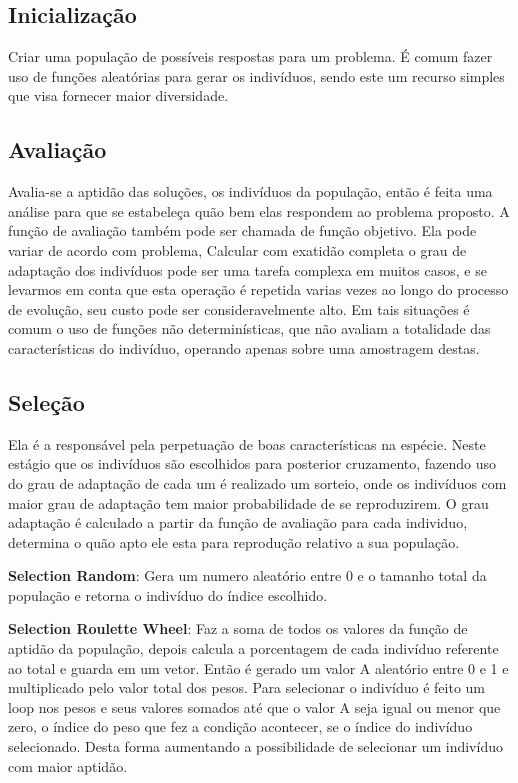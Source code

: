 \subsection{Inicialização}
Criar uma população de possíveis respostas para um problema. 
É comum fazer uso de funções aleatórias para gerar os indivíduos, sendo este um recurso simples que visa fornecer maior diversidade.

\subsection{Avaliação}
Avalia-se a aptidão das soluções, os indivíduos da população, então é feita uma análise para que se estabeleça quão bem elas respondem ao problema proposto.
A função de avaliação também pode ser chamada de função objetivo. Ela pode variar de acordo com problema,  
Calcular com exatidão completa o grau de adaptação dos indivíduos pode ser uma tarefa complexa em muitos casos, e se levarmos em conta que esta operação é repetida varias vezes ao longo do processo de evolução, seu custo pode ser consideravelmente alto. Em tais situações é comum o uso de funções não determinísticas, que não avaliam a totalidade das características do indivíduo, operando apenas sobre uma amostragem destas.

\subsection{Seleção}
Ela é a responsável pela perpetuação de boas características na espécie. 
Neste estágio que os indivíduos são escolhidos para posterior cruzamento, fazendo uso do grau de adaptação de cada um é realizado um sorteio, onde os indivíduos com maior grau de adaptação tem maior probabilidade de se reproduzirem.
O grau adaptação é calculado a partir da função de avaliação para cada individuo, determina o quão apto ele esta para reprodução relativo a sua população. 

\textbf{Selection Random}: Gera um numero aleatório entre 0 e o tamanho total da população e retorna o indivíduo do índice escolhido.

\textbf{Selection Roulette Wheel}: Faz a soma de todos os valores da função de aptidão da população, depois calcula a porcentagem de cada indivíduo referente ao total 
e guarda em um vetor. Então é gerado um valor A aleatório entre 0 e 1 e multiplicado pelo valor total dos pesos. Para selecionar o indivíduo é feito um loop 
nos pesos e seus valores somados até que o valor A seja igual ou menor que zero, o índice do peso que fez a condição acontecer, se o índice do indivíduo selecionado.
Desta forma aumentando a possibilidade de selecionar um indivíduo com maior aptidão.

